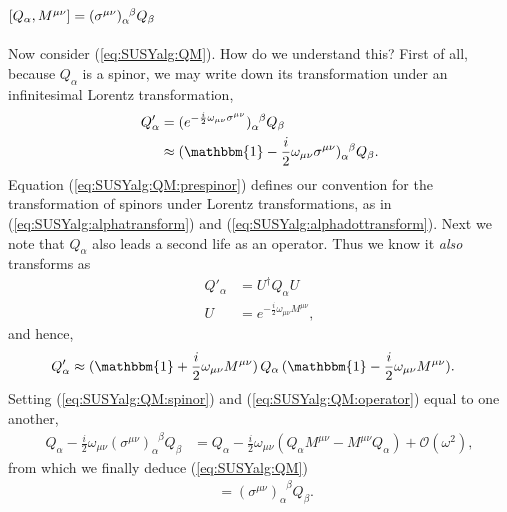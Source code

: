 \documentclass[12pt, oneside]{report}    %
\begin{document}
 \subsection{\texorpdfstring{
 $[Q_\alpha,M^{\mu\nu}] = (\sigma^{\mu\nu})_\alpha^{\hspace{.5em}\beta}Q_\beta$}{[Q,M]}}
 \label{sec:SUSYalg:QM}
 
Now consider  (\ref{eq:SUSYalg:QM}).
How do we understand this? First of all, because $Q_\alpha$ is a spinor, we may write down its transformation under an infinitesimal Lorentz transformation,
\begin{align}
    Q'_\alpha &= (e^{-\frac i2\omega_{\mu\nu}\sigma^{\mu\nu}})_\alpha^{\phantom\alpha\beta}Q_\beta \label{eq:SUSYalg:QM:prespinor}\\
    &\approx (\mathbbm{1}-\frac i2\omega_{\mu\nu}\sigma^{\mu\nu})_\alpha^{\phantom\alpha\beta}Q_\beta.\label{eq:SUSYalg:QM:spinor}
\end{align}
Equation (\ref{eq:SUSYalg:QM:prespinor}) defines our convention for the transformation of spinors under Lorentz transformations, as in (\ref{eq:SUSYalg:alphatransform}) and (\ref{eq:SUSYalg:alphadottransform}). 
%
Next we note that $Q_\alpha$ also leads a second life as an operator. Thus we know it \textit{also} transforms as
\begin{align}
    Q'_\alpha &= U^\dag Q_\alpha U\\
    U &= e^{-\frac i2 \omega_{\mu\nu}M^{\mu\nu}},
\end{align}
and hence,
\begin{align}
    Q'_\alpha &\approx (\mathbbm{1}+\frac i2\omega_{\mu\nu}M^{\mu\nu})\,Q_\alpha\, (\mathbbm{1}-\frac i2\omega_{\mu\nu}M^{\mu\nu}).\label{eq:SUSYalg:QM:operator}
\end{align}
Setting (\ref{eq:SUSYalg:QM:spinor}) and (\ref{eq:SUSYalg:QM:operator}) equal to one another, 
\begin{align}
    Q_\alpha - \frac i2 \omega_{\mu\nu}(\sigma^{\mu\nu})_\alpha^{\phantom\alpha\beta}Q_\beta &= Q_\alpha - \frac i2 \omega_{\mu\nu}(Q_\alpha M^{\mu\nu}-M^{\mu\nu}Q_\alpha)+\mathcal O(\omega^2),
\end{align}
from which we finally deduce  (\ref{eq:SUSYalg:QM})
\begin{align}
    [Q_\alpha,M^{\mu\nu}] &= (\sigma^{\mu\nu})_\alpha^{\phantom\alpha\beta}Q_\beta.
\end{align}
 
\end{document}
